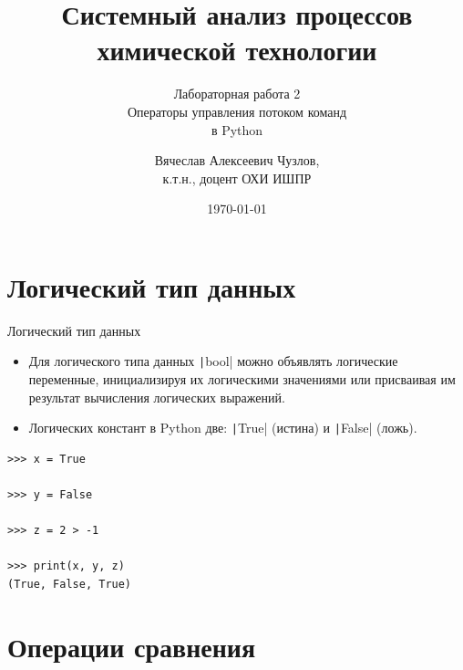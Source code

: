 \documentclass[aspectratio=169]{beamer}	%
\title{\LARGE{Системный анализ процессов химической технологии}}
\subtitle{Лабораторная работа 2 \\ Операторы управления потоком команд \\ в Python}
\author[]{Вячеслав Алексеевич Чузлов, \\
	к.т.н., доцент ОХИ ИШПР}
\date{\today}
\begin{document}

\titleframe		%

\tocframe{}		%



\section{Логический тип данных}
\sectionframe


\begin{frame}[fragile]{Логический тип данных}
\scriptsize
\begin{itemize}

\item Для логического типа данных \texttt|bool| можно объявлять логические переменные, инициализируя их логическими значениями или присваивая им результат вычисления логических выражений.

\item Логических констант в Python две: \texttt|True| (истина) и \texttt|False| (ложь).
\end{itemize}

\begin{verbatim}
>>> x = True

>>> y = False

>>> z = 2 > -1

>>> print(x, y, z)
(True, False, True)
\end{verbatim}

\vfill
\end{frame}


\section{Операции сравнения}
\sectionframe
\end{document}

